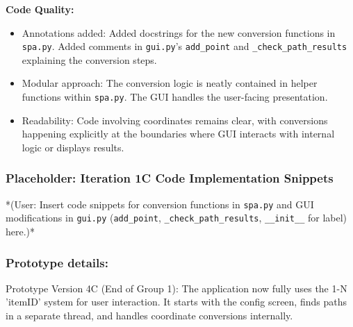 \textbf{Code Quality:}
\begin{itemize}
	\item Annotations added: Added docstrings for the new conversion functions in \verb|spa.py|. Added comments in \verb|gui.py|'s \verb|add_point| and \verb|_check_path_results| explaining the conversion steps.
	\item Modular approach: The conversion logic is neatly contained in helper functions within \verb|spa.py|. The GUI handles the user-facing presentation.
	\item Readability: Code involving coordinates remains clear, with conversions happening explicitly at the boundaries where GUI interacts with internal logic or displays results.
\end{itemize}

\newpage
\subsubsection*{Placeholder: Iteration 1C Code Implementation Snippets}
*(User: Insert code snippets for conversion functions in \verb|spa.py| and GUI modifications in \verb|gui.py| (\verb|add_point|, \verb|_check_path_results|, \verb|__init__| for label) here.)*
\newpage

\subsubsection{Prototype details:}
Prototype Version 4C (End of Group 1): The application now fully uses the 1-N 'itemID' system for user interaction. It starts with the config screen, finds paths in a separate thread, and handles coordinate conversions internally.

